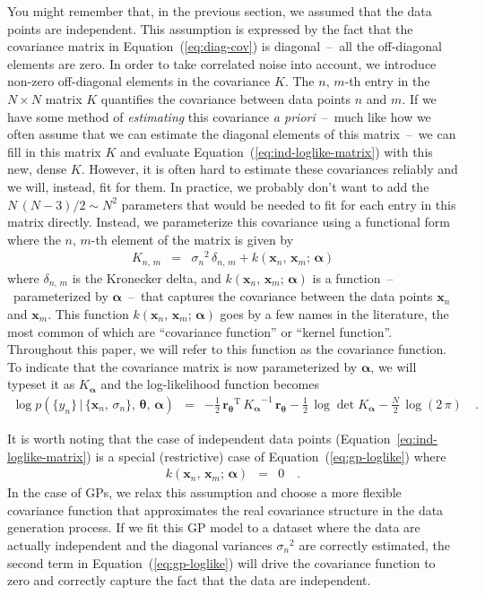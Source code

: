 \documentclass[modern, letterpaper]{aastex61}
\newcommand{\foreign}[1]{\emph{#1}}
\renewcommand{\eqref}[1]{\ref{eq:#1}}
\newcommand{\Eq}[1]{Equation~(\eqref{#1})}
\newcommand{\eq}[1]{\Eq{#1}}
\newcommand{\eqalt}[1]{Equation~\eqref{#1}}
\newcommand{\eqlabel}[1]{\label{eq:#1}}
\newcommand{\T}{\ensuremath{\mathrm{T}}}
\newcommand{\bvec}[1]{{\ensuremath{\boldsymbol{#1}}}}
\begin{document}
You might remember that, in the previous section, we assumed that the data
points are independent.
This assumption is expressed by the fact that the covariance matrix in
\eq{diag-cov} is diagonal~--~all the off-diagonal elements are zero.
In order to take correlated noise into account, we introduce non-zero
off-diagonal elements in the covariance $K$.
The $n,\,m$-th entry in the $N \times N$ matrix $K$ quantifies the covariance
between data points $n$ and $m$.
If we have some method of \emph{estimating} this covariance \foreign{a
priori}~--~much like how we often assume that we can estimate the diagonal
elements of this matrix~--~we can fill in this matrix $K$ and evaluate
\eq{ind-loglike-matrix} with this new, dense $K$.
However, it is often hard to estimate these covariances reliably and we will,
instead, fit for them.
In practice, we probably don't want to add the $N\,(N-3)/2 \sim N^2$
parameters that would be needed to fit for each entry in this matrix directly.
Instead, we parameterize this covariance using a functional form where the
$n,\,m$-th element of the matrix is given by
\begin{eqnarray}\eqlabel{kernel}
K_{n,\,m} &=& {\sigma_n}^2\,\delta_{n,\,m} +
    k(\bvec{x}_n,\,\bvec{x}_m;\,\bvec{\alpha})
\end{eqnarray}
where $\delta_{n,\,m}$ is the Kronecker delta, and $k(\bvec{x}_n,\,\bvec{x}_m;
\,\bvec{\alpha})$ is a function~--~parameterized by $\bvec{\alpha}$~--~that
captures the covariance between the data points $\bvec{x}_n$ and $\bvec{x}_m$.
This function $k(\bvec{x}_n,\,\bvec{x}_m;\,\bvec{\alpha})$ goes by a few names
in the literature, the most common of which are ``covariance function'' or
``kernel function''.
Throughout this paper, we will refer to this function as the covariance
function.
To indicate that the covariance matrix is now parameterized by
$\bvec{\alpha}$, we will typeset it as $K_\bvec{\alpha}$ and the
log-likelihood function becomes
\begin{eqnarray}\eqlabel{gp-loglike}
\log p(\{y_n\}\,|\,\{\bvec{x}_n,\,\sigma_n\},\,\bvec{\theta},\,\bvec{\alpha})
    &=&
    -\frac{1}{2}\,{\bvec{r}_\bvec{\theta}}^\T\,{K_\bvec{\alpha}}^{-1}\,
        {\bvec{r}_\bvec{\theta}}
    -\frac{1}{2}\,\log\det K_\bvec{\alpha}
    -\frac{N}{2}\,\log(2\,\pi) \quad.
\end{eqnarray}

It is worth noting that the case of independent data points
(\eqalt{ind-loglike-matrix}) is a special (restrictive) case of
\eq{gp-loglike} where
\begin{eqnarray}
k(\bvec{x}_n,\,\bvec{x}_m;\,\bvec{\alpha}) &=& 0 \quad.
\end{eqnarray}
In the case of GPs, we relax this assumption and choose a more flexible
covariance function that approximates the real covariance structure in the
data generation process.
If we fit this GP model to a dataset where the data are actually independent
and the diagonal variances ${\sigma_n}^2$ are correctly estimated, the second
term in \eq{gp-loglike} will drive the covariance function to zero and
correctly capture the fact that the data are independent.
\end{document}

